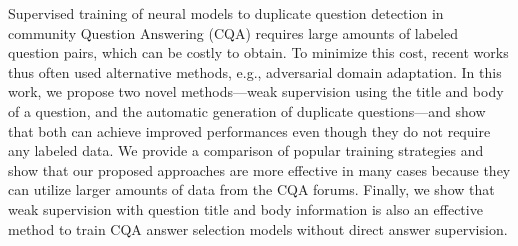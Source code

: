 Supervised training of neural models to duplicate question detection in community Question Answering (CQA) requires large amounts of labeled question pairs, which can be costly to obtain. To minimize this cost, recent works thus often used alternative methods, e.g., adversarial domain adaptation. In this work, we propose two novel methods---weak supervision using the title and body of a question, and the automatic generation of duplicate questions---and show that both can achieve improved performances even though they do not require any labeled data. We provide a comparison of popular training strategies and show that our proposed approaches are more effective in many cases because they can utilize larger amounts of data from the CQA forums. Finally, we show that weak supervision with question title and body information is also an effective method to train CQA answer selection models without direct answer supervision.